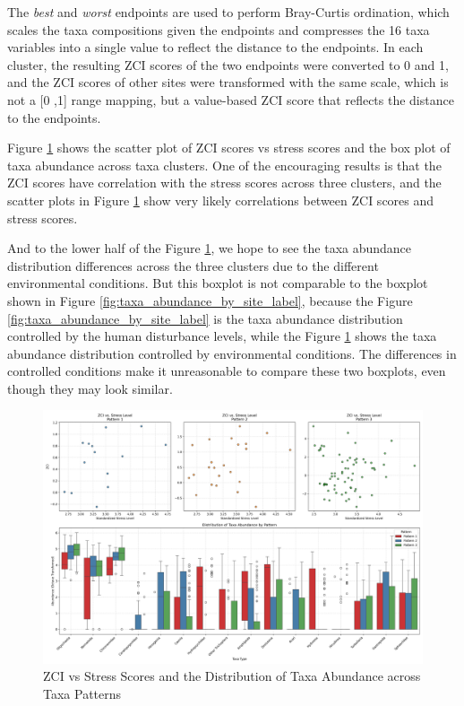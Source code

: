 The \textit{best} and \textit{worst} endpoints are used to perform Bray-Curtis ordination,
which scales the taxa compositions given the endpoints and compresses the 16 taxa variables into a single value
to reflect the distance to the endpoints.
In each cluster, the resulting ZCI scores of the two endpoints were converted to 0 and 1, 
and the ZCI scores of other sites were transformed with the same scale, which is not a [0 ,1] range mapping,
but a value-based ZCI score that reflects the distance to the endpoints.

Figure \textcolor{blue}{\ref{fig:zci_vs_stress_and_taxa_abundance}} 
shows the scatter plot of ZCI scores vs stress scores and the box plot of taxa abundance across taxa clusters.
One of the encouraging results is that the ZCI scores have correlation with the stress scores across three clusters,
and the scatter plots in Figure \textcolor{blue}{\ref{fig:zci_vs_stress_and_taxa_abundance}}
show very likely correlations between ZCI scores and stress scores.

And to the lower half of the Figure \textcolor{blue}{\ref{fig:zci_vs_stress_and_taxa_abundance}},
we hope to see the taxa abundance distribution differences across the three clusters 
due to the different environmental conditions. 
But this boxplot is not comparable to the boxplot shown in Figure \textcolor{blue}{\ref{fig:taxa_abundance_by_site_label}},
because the Figure \textcolor{blue}{\ref{fig:taxa_abundance_by_site_label}} is the taxa abundance distribution controlled by 
the human disturbance levels, while the Figure \textcolor{blue}{\ref{fig:zci_vs_stress_and_taxa_abundance}}
shows the taxa abundance distribution controlled by environmental conditions.
The differences in controlled conditions make it unreasonable to compare these two boxplots, even though
they may look similar.

\begin{figure}[!h]
    \centering
    \includegraphics[width=\textwidth]{../results/preliminary_results/zci_vs_stress_and_taxa_abundance.png}
    \caption{ZCI vs Stress Scores and the Distribution of Taxa Abundance across Taxa Patterns}
    \label{fig:zci_vs_stress_and_taxa_abundance}
\end{figure}

